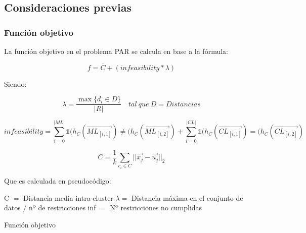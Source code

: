 
\subsection{Consideraciones previas}

\subsubsection{Función objetivo}

La función objetivo en el problema PAR se calcula en base a la fórmula:

\begin{equation}
    f = \overline{C} + (infeasibility * \lambda)
\end{equation}

Siendo:

\begin{equation}
    \lambda = \frac{\max \{d_i \in D\}}{|R|} \quad tal\ que \ D = Distancias
\end{equation}

\begin{equation}
    infeasibility = \sum_{i=0}^{|ML|} \mathds{1}(h_{C}(\overrightarrow{ML_{[i,1]}}) \neq (h_{C}(\overrightarrow{ML_{[i,2]}}) + \sum_{i=0}^{|CL|} \mathds{1}(h_{C}(\overrightarrow{CL_{[i,1]}}) = (h_{C}(\overrightarrow{CL_{[i,2]}})
\end{equation}

\begin{equation}
    \overline{C} = \frac{1}{k} \sum_{c_{i}\in C} || \overrightarrow{x_j} - \overrightarrow{u_j} ||_{2}
\end{equation}

Que es calculada en pseudocódigo: \\

\begin{algorithm}[H]
    \SetAlgoLined
        C $=$ Distancia media intra-cluster \;
        $\lambda =$ Distancia máxima en el conjunto de datos / nº de restricciones  \;
        inf $=$ Nº restricciones no cumplidas \;
    \caption{Función objetivo}
\end{algorithm}

